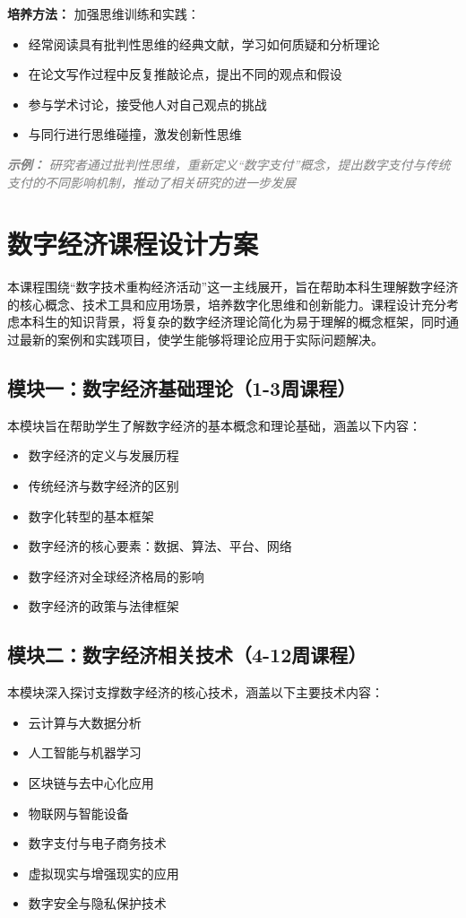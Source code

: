 \documentclass[lang=cn,12pt,a4paper]{elegantpaper}
\newcommand{\skillexample}[1]{\smallskip\noindent\textcolor{gray}{\textit{\footnotesize\textbf{示例：}} \textit{\footnotesize #1}}}
\begin{document}
{\textbf{培养方法：}} 加强思维训练和实践：
\begin{itemize}
    \item 经常阅读具有批判性思维的经典文献，学习如何质疑和分析理论
    \item 在论文写作过程中反复推敲论点，提出不同的观点和假设
    \item 参与学术讨论，接受他人对自己观点的挑战
    \item 与同行进行思维碰撞，激发创新性思维
\end{itemize}

\skillexample{研究者通过批判性思维，重新定义“数字支付”概念，提出数字支付与传统支付的不同影响机制，推动了相关研究的进一步发展}


\section{数字经济课程设计方案}

本课程围绕“数字技术重构经济活动”这一主线展开，旨在帮助本科生理解数字经济的核心概念、技术工具和应用场景，培养数字化思维和创新能力。课程设计充分考虑本科生的知识背景，将复杂的数字经济理论简化为易于理解的概念框架，同时通过最新的案例和实践项目，使学生能够将理论应用于实际问题解决。

\subsection{模块一：数字经济基础理论（1-3周课程）}

本模块旨在帮助学生了解数字经济的基本概念和理论基础，涵盖以下内容：
\begin{itemize}
    \item 数字经济的定义与发展历程
    \item 传统经济与数字经济的区别
    \item 数字化转型的基本框架
    \item 数字经济的核心要素：数据、算法、平台、网络
    \item 数字经济对全球经济格局的影响
    \item 数字经济的政策与法律框架
\end{itemize}

\subsection{模块二：数字经济相关技术（4-12周课程）}

本模块深入探讨支撑数字经济的核心技术，涵盖以下主要技术内容：
\begin{itemize}
    \item 云计算与大数据分析
    \item 人工智能与机器学习
    \item 区块链与去中心化应用
    \item 物联网与智能设备
    \item 数字支付与电子商务技术
    \item 虚拟现实与增强现实的应用
    \item 数字安全与隐私保护技术
\end{itemize}
\end{document}
